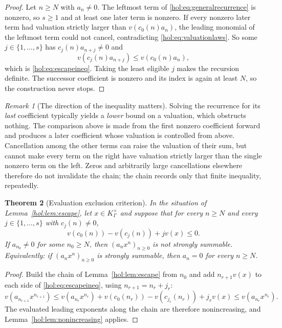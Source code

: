 \documentclass[11pt]{article}
\numberwithin{equation}{section}
\newtheorem{theorem}{Theorem}[section]
\theoremstyle{definition}
\theoremstyle{remark}
\newtheorem{remark}[theorem]{Remark}
\newcommand{\K}{K_\Gamma}
\begin{document}
\begin{proof}
Let $n\ge N$ with $a_n\ne0$. The leftmost term of
\eqref{hol:eq:generalrecurrence} is nonzero, so $s\ge1$ and at least one later
term is nonzero. If every nonzero later term had valuation strictly larger
than $v(c_0(n)a_n)$, the leading monomial of the leftmost term could not
cancel, contradicting \eqref{hol:eq:valuationlaws}. So some
$j\in\{1,\ldots,s\}$ has $c_j(n)a_{n+j}\ne0$ and
\[
 v(c_j(n)a_{n+j})\le v(c_0(n)a_n),
\]
which is \eqref{hol:eq:escapeineq}. Taking the least eligible $j$ makes the
recursion definite. The successor coefficient is nonzero and its index is
again at least $N$, so the construction never stops.
\end{proof}

\begin{remark}[The direction of the inequality matters]
\label{hol:rem:direction}
Solving the recurrence for its \emph{last} coefficient typically yields a
\emph{lower} bound on a valuation, which obstructs nothing. The comparison
above is made from the first nonzero coefficient forward and produces a later
coefficient whose valuation is controlled from above. Cancellation among the
other terms can raise the valuation of their sum, but cannot make every term
on the right have valuation strictly larger than the single nonzero term on
the left. Zeros and arbitrarily large cancellations elsewhere therefore do not
invalidate the chain; the chain records only that finite inequality,
repeatedly.
\end{remark}

\begin{theorem}[Evaluation exclusion criterion]\label{hol:thm:escapeexclusion}
In the situation of Lemma~\ref{hol:lem:escape}, let $x\in\K^\times$ and
suppose that for every $n\ge N$ and every $j\in\{1,\ldots,s\}$ with
$c_j(n)\ne0$,
\begin{equation}\label{hol:eq:boundincrements}
 v(c_0(n))-v(c_j(n))+jv(x)\le0.
\end{equation}
If $a_{n_0}\ne0$ for some $n_0\ge N$, then $(a_nx^n)_{n\ge0}$ is not strongly
summable. Equivalently: if $(a_nx^n)_{n\ge0}$ is strongly summable, then
$a_n=0$ for every $n\ge N$.
\end{theorem}

\begin{proof}
Build the chain of Lemma~\ref{hol:lem:escape} from $n_0$ and add
$n_{r+1}v(x)$ to each side of \eqref{hol:eq:escapeineq}, using
$n_{r+1}=n_r+j_r$:
\[
 v(a_{n_{r+1}}x^{n_{r+1}})
 \le v(a_{n_r}x^{n_r})+v(c_0(n_r))-v(c_{j_r}(n_r))+j_rv(x)
 \le v(a_{n_r}x^{n_r}).
\]
The evaluated leading exponents along the chain are therefore nonincreasing,
and Lemma~\ref{hol:lem:nonincreasing} applies.
\end{proof}
\end{document}
